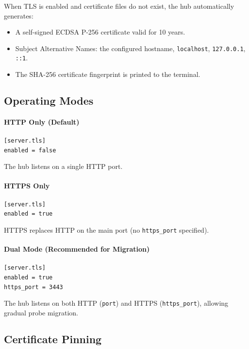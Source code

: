 \documentclass[12pt]{report}
\begin{document}
When TLS is enabled and certificate files do not exist, the hub
automatically generates:

\begin{itemize}
    \item A self-signed ECDSA P-256 certificate valid for 10 years.
    \item Subject Alternative Names: the configured hostname,
          \texttt{localhost}, \texttt{127.0.0.1}, \texttt{::1}.
    \item The SHA-256 certificate fingerprint is printed to the terminal.
\end{itemize}

\subsection{Operating Modes}

\paragraph{HTTP Only (Default)}

\begin{lstlisting}
[server.tls]
enabled = false
\end{lstlisting}

The hub listens on a single HTTP port.

\paragraph{HTTPS Only}

\begin{lstlisting}
[server.tls]
enabled = true
\end{lstlisting}

HTTPS replaces HTTP on the main port (no \texttt{https\_port} specified).

\paragraph{Dual Mode (Recommended for Migration)}

\begin{lstlisting}
[server.tls]
enabled = true
https_port = 3443
\end{lstlisting}

The hub listens on both HTTP (\texttt{port}) and HTTPS
(\texttt{https\_port}), allowing gradual probe migration.

\subsection{Certificate Pinning}
\end{document}
